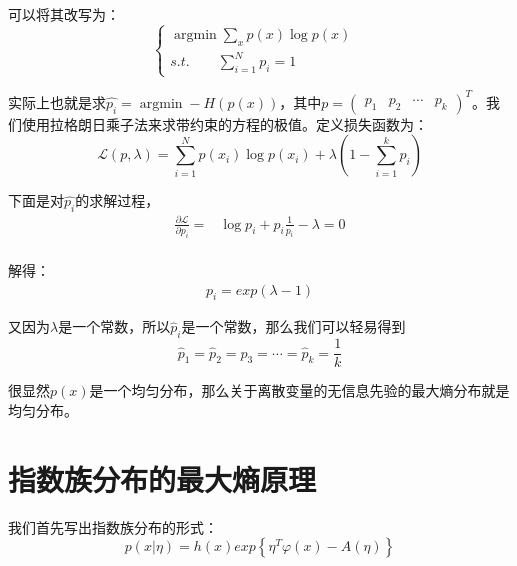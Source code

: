 \documentclass[a4paper]{article}
\DeclareMathOperator*{\argmin}{argmin}
\begin{document}
可以将其改写为：
\begin{equation}
    \left\{
    \begin{array}{ll}
          \mathop{\argmin} \sum_x p(x)\log p(x) & \\
         s.t. \qquad \sum_{i=1}^Np_i=1 &
    \end{array}
    \right.
\end{equation}

实际上也就是求$\hat{p_i} = \mathop{\argmin} -H(p(x))$，其中$p=\begin{pmatrix} p_1 & p_2 & \cdots & p_k \end{pmatrix}^T$。我们使用拉格朗日乘子法来求带约束的方程的极值。定义损失函数为：
\begin{equation}
    \mathcal{L}(p,\lambda) = \sum_{i=1}^N p(x_i)\log p(x_i) + \lambda(1-\sum_{i=1}^k p_i)
\end{equation}

下面是对$\hat{p_i}$的求解过程，
\begin{equation}
    \begin{split}
        \frac{\partial \mathcal{L}}{\partial p_i} = & \log p_i + p_i \frac{1}{p_i} - \lambda = 0 \\
    \end{split}
\end{equation}

解得：
\begin{equation}
    \begin{split}
        p_i = exp(\lambda-1)
    \end{split}
\end{equation}

又因为$\lambda$是一个常数，所以$\hat{p}_i$是一个常数，那么我们可以轻易得到
\begin{equation}
    \hat{p}_1 = \hat{p}_2 = \hat{p}_3 = \cdots = \hat{p}_k = \frac{1}{k}
\end{equation}

很显然$p(x)$是一个均匀分布，那么关于离散变量的无信息先验的最大熵分布就是均匀分布。

\section{指数族分布的最大熵原理}

我们首先写出指数族分布的形式：
\begin{equation}
    p(x|\eta)=h(x)exp\left\{ \eta^T\varphi(x)-A(\eta) \right\}
\end{equation}
\end{document}
